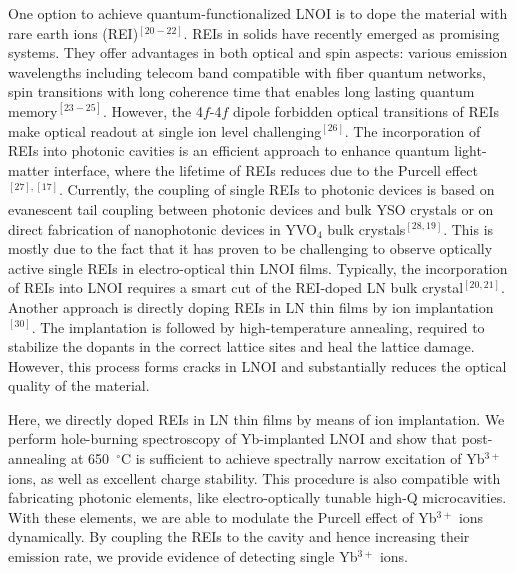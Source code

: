 \documentclass[prl,reprint,superscriptaddress]{revtex4-1}
\begin{document}
One option to achieve quantum-functionalized LNOI is to dope the material with rare earth ions (REI)$^{[20-22]}$. REIs in solids have recently emerged as promising systems. They offer advantages in both optical and spin aspects: various emission wavelengths including telecom band compatible with fiber quantum networks, spin transitions with long coherence time that enables long lasting quantum memory$^{[23-25]}$. However, the 4$f$-4$f$ dipole forbidden optical transitions of REIs make optical readout at single ion level challenging$^{[26]}$. The incorporation of REIs into photonic cavities is an efficient approach to enhance quantum light-matter interface, where the lifetime of REIs reduces due to the Purcell effect$^{[27],[17]}$. Currently, the coupling of single REIs to photonic devices is based on evanescent tail coupling between  photonic devices and bulk YSO crystals or on direct fabrication of nanophotonic devices in YVO$\mathrm{_4}$ bulk crystals$^{[28,19]}$. This is mostly due to the fact that it has proven to be challenging to observe optically active single REIs in electro-optical thin LNOI films. Typically, the incorporation of REIs into LNOI requires a smart cut of the REI-doped LN bulk crystal$^{[20,21]}$. Another approach is directly doping REIs in LN thin films by ion implantation$^{[30]}$. The implantation is followed by high-temperature annealing, required to stabilize the dopants in the correct lattice sites and heal the lattice damage. However, this process forms cracks in LNOI and substantially reduces the optical quality of the material. 
  
      
Here, we directly doped REIs in LN thin films by means of ion implantation. We perform hole-burning spectroscopy of Yb-implanted LNOI and show that post-annealing at 650~$^{\circ}$C is sufficient to achieve spectrally narrow excitation of Yb$\mathrm{^{3+}}$ ions, as well as excellent charge stability. This procedure is also compatible with fabricating photonic elements, like electro-optically tunable high-Q microcavities. With these elements, we are able to modulate the Purcell effect of Yb$\mathrm{^{3+}}$ ions  dynamically.  By coupling  the REIs to the cavity and hence increasing their emission rate, we provide evidence of detecting single Yb$^{3+}$ ions.
      
      
      
\end{document}
